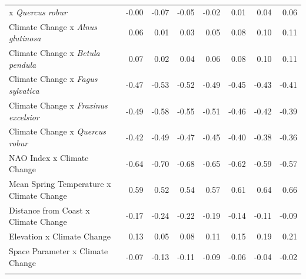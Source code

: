 \documentclass{article}\usepackage[]{graphicx}\usepackage[]{color}
\begin{document}
\begin{longtable}{lrrrrrrr}
x\textit{ Quercus robur} & -0.00 & -0.07 & -0.05 & -0.02 & 0.01 & 0.04 & 0.06 \\ 
  Climate Change
x\textit{ Alnus glutinosa} & 0.06 & 0.01 & 0.03 & 0.05 & 0.08 & 0.10 & 0.11 \\ 
  Climate Change
x\textit{ Betula pendula} & 0.07 & 0.02 & 0.04 & 0.06 & 0.08 & 0.10 & 0.11 \\ 
  Climate Change
x\textit{ Fagus sylvatica} & -0.47 & -0.53 & -0.52 & -0.49 & -0.45 & -0.43 & -0.41 \\ 
  Climate Change
x\textit{ Fraxinus excelsior} & -0.49 & -0.58 & -0.55 & -0.51 & -0.46 & -0.42 & -0.39 \\ 
  Climate Change
x\textit{ Quercus robur} & -0.42 & -0.49 & -0.47 & -0.45 & -0.40 & -0.38 & -0.36 \\ 
  NAO Index x Climate Change & -0.64 & -0.70 & -0.68 & -0.65 & -0.62 & -0.59 & -0.57 \\ 
  Mean Spring 
Temperature x Climate Change & 0.59 & 0.52 & 0.54 & 0.57 & 0.61 & 0.64 & 0.66 \\ 
  Distance from 
Coast x Climate Change & -0.17 & -0.24 & -0.22 & -0.19 & -0.14 & -0.11 & -0.09 \\ 
  Elevation x Climate Change & 0.13 & 0.05 & 0.08 & 0.11 & 0.15 & 0.19 & 0.21 \\ 
  Space Parameter x Climate Change & -0.07 & -0.13 & -0.11 & -0.09 & -0.06 & -0.04 & -0.02 \\ 
   \hline
\hline
\label{tab:suppmoddvr}
\end{longtable}
\end{document}
